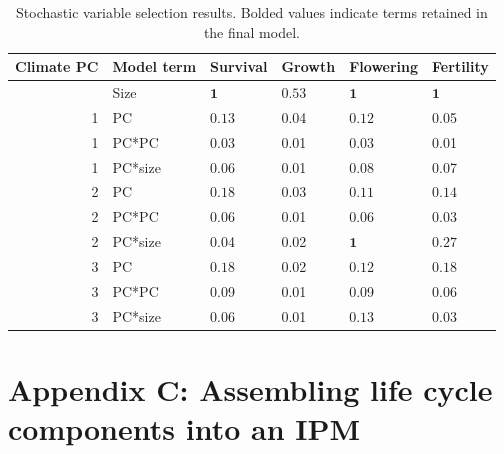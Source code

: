 \documentclass[12pt]{article}\usepackage[]{graphicx}\usepackage[]{color}
\begin{document}
\begin{table}[ht]
\centering
\begin{tabular}{rlllll}
  \hline
Climate PC & Model term & Survival & Growth & Flowering & Fertility \\ 
  \hline
 & Size & $\mathbf{1}$ & $\mathbf{0.53}$ & $\mathbf{1}$ & $\mathbf{1}$ \\ 
    1 & PC & $\mathbf{0.13}$ & 0.04 & $\mathbf{0.12}$ & 0.05 \\ 
    1 & PC*PC & 0.03 & 0.01 & 0.03 & 0.01 \\ 
    1 & PC*size & 0.06 & 0.01 & 0.08 & 0.07 \\ 
    2 & PC & $\mathbf{0.18}$ & 0.03 & $\mathbf{0.11}$ & $\mathbf{0.14}$ \\ 
    2 & PC*PC & 0.06 & 0.01 & 0.06 & 0.03 \\ 
    2 & PC*size & 0.04 & 0.02 & $\mathbf{1}$ & $\mathbf{0.27}$ \\ 
    3 & PC & $\mathbf{0.18}$ & 0.02 & $\mathbf{0.12}$ & $\mathbf{0.18}$ \\ 
    3 & PC*PC & 0.09 & 0.01 & 0.09 & 0.06 \\ 
    3 & PC*size & 0.06 & 0.01 & $\mathbf{0.13}$ & 0.03 \\ 
   \hline
\end{tabular}
\caption{Stochastic variable selection results. Bolded values indicate terms retained in the final model.} 
\label{tab:SVS}
\end{table}



\newpage
\section*{Appendix C: Assembling life cycle components into an IPM}
\end{document}
